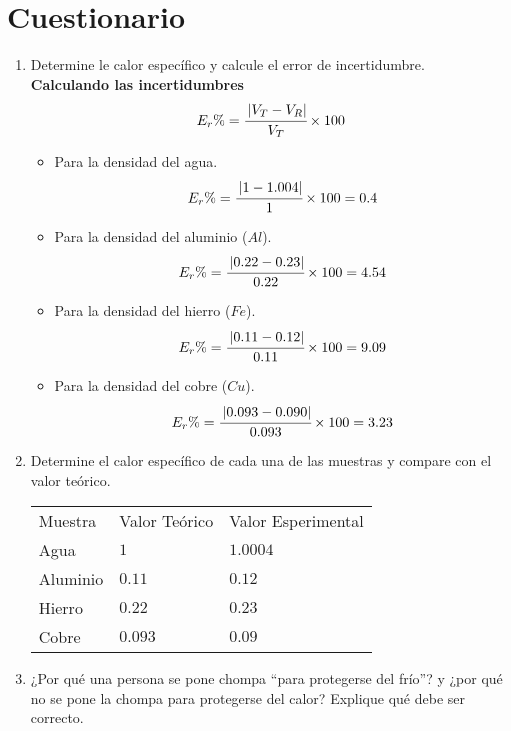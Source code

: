 \section{Cuestionario}
\begin{enumerate}[itemsep=2pt]
	\item Determine le calor específico y calcule el error de incertidumbre.\\
	      \textbf{Calculando las incertidumbres}
	      \[E_r \%= \cfrac{\left\lvert V_T-V_R\right\rvert }{V_T}\times100\]

	      \begin{itemize}[label=\textbf{$\bullet$},itemsep=2pt,partopsep=6pt]
		      \item Para la densidad del agua.
		            \[E_r \%= \cfrac{\left\lvert 1-1.004\right\rvert }{1}\times100=0.4\]
		      \item Para la densidad del aluminio ($Al$).
		            \[E_r \%= \cfrac{\left\lvert 0.22-0.23\right\rvert }{0.22}\times100=4.54\]
		      \item Para la densidad del hierro ($Fe$).
		            \[E_r \%= \cfrac{\left\lvert 0.11-0.12\right\rvert }{0.11}\times100=9.09\]
		      \item Para la densidad del cobre ($Cu$).
		            \[E_r \%= \cfrac{\left\lvert 0.093-0.090\right\rvert }{0.093}\times100=3.23\]
	      \end{itemize}
	\item Determine el calor específico de cada una de las muestras y compare con el valor teórico.
	      \begin{table}[H]
		      \centering
		      \begin{tabular}{L{2cm}C{3cm}C{3cm}}
			      Muestra & Valor Teórico & Valor Esperimental \\
			      Agua                      & $1$           & $1.0004$           \\
			      Aluminio                  & $0.11$        & $0.12$             \\
			      Hierro                    & $0.22$        & $0.23$             \\
			      Cobre                     & $0.093$       & $0.09$             \\
		      \end{tabular}
	      \end{table}
	\item ¿Por qué una persona se pone chompa ``para protegerse del frío''? y ¿por qué no se pone la chompa para protegerse del calor? Explique qué debe ser correcto.


\end{enumerate}
